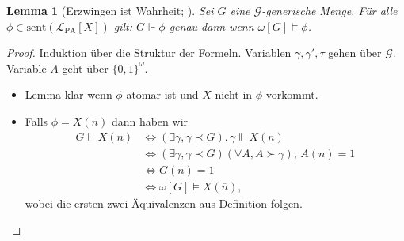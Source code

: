 \documentclass[nofonts]{uebung}
\newtheorem{lemma}[theorem]{Lemma}
\theoremstyle{definition}
\DeclareMathOperator{\dom}{dom}
\begin{document}
\begin{lemma}[Erzwingen ist Wahrheit; \cite{fenner_oracle_2003}]\label{lemma:forcing-is-truth}
    Sei $G$ eine $\mathcal G$-generische Menge. 
    Für alle $\phi\in \mathrm{sent}(\mathcal L_{\mathrm{PA}}[X])$ gilt:
    $G\Vdash \phi$ genau dann wenn $\omega[G]\vDash \phi$.
\end{lemma}
\begin{proof}
    Induktion über die Struktur der Formeln. Variablen $\gamma, \gamma', \tau$ gehen über $\mathcal G$. Variable $A$ geht über $\{0,1\}^{\omega}$.
    \begin{itemize}
        \item Lemma klar wenn $\phi$ atomar ist und $X$ nicht in $\phi$ vorkommt.
        \item Falls $\phi=X(\overline n)$ dann haben wir
            \begin{align*}
                G\Vdash X(\overline n) &\iff (\exists \gamma, \gamma\prec G).\,\gamma\Vdash X(\overline n)\\
                             &\iff (\exists \gamma, \gamma\prec G)(\forall A, A\succ \gamma),\, A(n)=1\\
                             &\iff G(n)=1 \\
                             &\iff \omega[G]\vDash X(\overline n),
            \end{align*}
            wobei die ersten zwei Äquivalenzen aus Definition folgen.

\end{itemize}
\end{proof}
\end{document}
